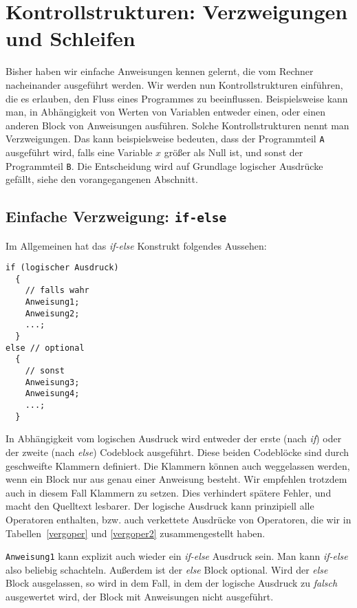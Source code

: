\section{Kontrollstrukturen: Verzweigungen und Schleifen}

Bisher haben wir einfache Anweisungen kennen gelernt, die vom Rechner nacheinander ausgeführt werden.
Wir werden nun Kontrollstrukturen einführen, die es erlauben, den Fluss eines Programmes zu beeinflussen.
Beispielsweise kann man, in Abhängigkeit von Werten von Variablen entweder einen, oder einen anderen Block von Anweisungen ausführen.
Solche Kontrollstrukturen nennt man Verzweigungen.
Das kann beispielsweise bedeuten, dass der Programmteil \texttt{A} ausgeführt wird, falls eine Variable $x$ größer als Null ist, und sonst der Programmteil \texttt{B}.
Die Entscheidung wird auf Grundlage logischer Ausdrücke gefällt, siehe den vorangegangenen Abschnitt.

\subsection{Einfache Verzweigung: \texttt{if-else}}

Im Allgemeinen hat das \emph{if-else} Konstrukt folgendes Aussehen:
\begin{lstlisting}[caption={if-else Statement}, belowcaptionskip=0.3em]
if (logischer Ausdruck)
  {
    // falls wahr
    Anweisung1;
    Anweisung2;
    ...;
  }
else // optional
  {
    // sonst
    Anweisung3;
    Anweisung4;
    ...;
  }
\end{lstlisting}
In Abhängigkeit vom logischen Ausdruck wird entweder der erste (nach \emph{if}) oder der zweite (nach \emph{else}) Codeblock ausgeführt.
Diese beiden Codeblöcke sind durch geschweifte Klammern definiert.
Die Klammern können auch weggelassen werden, wenn ein Block nur aus genau einer Anweisung besteht.
Wir empfehlen trotzdem auch in diesem Fall Klammern zu setzen.
Dies verhindert spätere Fehler, und macht den Quelltext lesbarer.
Der logische Ausdruck kann prinzipiell alle Operatoren enthalten, bzw. auch verkettete Ausdrücke von Operatoren, die wir in Tabellen~\ref{vergoper} und \ref{vergoper2} zusammengestellt haben.

\verb|Anweisung1| kann explizit auch wieder ein \emph{if-else} Ausdruck sein. 
Man kann \emph{if-else} also beliebig schachteln.
Außerdem ist der \emph{else} Block optional.
Wird der \emph{else} Block ausgelassen, so wird in dem Fall, in dem der logische Ausdruck zu \emph{falsch} ausgewertet wird, der Block mit Anweisungen nicht ausgeführt.

